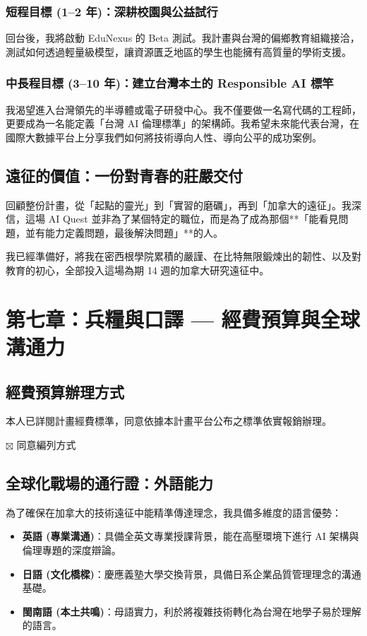 \documentclass[12pt,a4paper]{article}
\begin{document}
\subsubsection{短程目標 (1--2 年)：深耕校園與公益試行}
回台後，我將啟動 EduNexus 的 Beta 測試。我計畫與台灣的偏鄉教育組織接洽，測試如何透過輕量級模型，讓資源匱乏地區的學生也能擁有高質量的學術支援。

\subsubsection{中長程目標 (3--10 年)：建立台灣本土的 Responsible AI 標竿}
我渴望進入台灣領先的半導體或電子研發中心。我不僅要做一名寫代碼的工程師，更要成為一名能定義「台灣 AI 倫理標準」的架構師。我希望未來能代表台灣，在國際大數據平台上分享我們如何將技術導向人性、導向公平的成功案例。

\newpage

\subsection{遠征的價值：一份對青春的莊嚴交付}

回顧整份計畫，從「起點的靈光」到「實習的磨礪」，再到「加拿大的遠征」。我深信，這場 AI Quest 並非為了某個特定的職位，而是為了成為那個**「能看見問題，並有能力定義問題，最後解決問題」**的人。

我已經準備好，將我在密西根學院累積的嚴謹、在比特無限鍛煉出的韌性、以及對教育的初心，全部投入這場為期 14 週的加拿大研究遠征中。

\newpage

\section{第七章：兵糧與口譯 --- 經費預算與全球溝通力}

\subsection{經費預算辦理方式}

本人已詳閱計畫經費標準，同意依據本計畫平台公布之標準依實報銷辦理。

\vspace{0.3cm}
$\boxtimes$ 同意編列方式

\subsection{全球化戰場的通行證：外語能力}

為了確保在加拿大的技術遠征中能精準傳達理念，我具備多維度的語言優勢：
\begin{itemize}
    \item \textbf{英語 (專業溝通)}：具備全英文專業授課背景，能在高壓環境下進行 AI 架構與倫理專題的深度辯論。
    \item \textbf{日語 (文化橋樑)}：慶應義塾大學交換背景，具備日系企業品質管理理念的溝通基礎。
    \item \textbf{閩南語 (本土共鳴)}：母語實力，利於將複雜技術轉化為台灣在地學子易於理解的語言。
\end{itemize}
\end{document}
